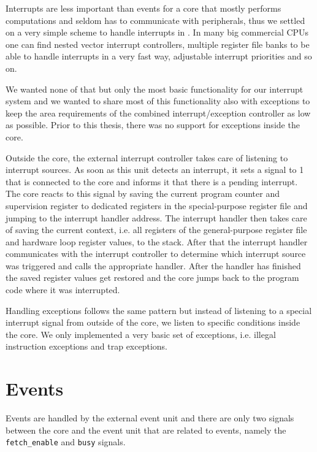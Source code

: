 Interrupts are less important than events for a core that mostly performs
computations and seldom has to communicate with peripherals, thus we settled on
a very simple scheme to handle interrupts in \orion. In many big commercial
\glspl{CPU} one can find nested vector interrupt controllers, multiple register
file banks to be able to handle interrupts in a very fast way, adjustable
interrupt priorities and so on.

We wanted none of that but only the most basic functionality for our interrupt
system and we wanted to share most of this functionality also with exceptions to
keep the area requirements of the combined interrupt/exception controller as low
as possible. Prior to this thesis, there was no support for exceptions inside
the \orion core.

Outside the core, the external interrupt controller takes care of listening to
interrupt sources. As soon as this unit detects an interrupt, it sets a signal
to 1 that is connected to the core and informs it that there is a pending
interrupt. The core reacts to this signal by saving the current program counter
and supervision register to dedicated registers in the special-purpose register
file and jumping to the interrupt handler address. The interrupt handler then
takes care of saving the current context, i.e. all registers of the
general-purpose register file and hardware loop register values, to the stack.
After that the interrupt handler communicates with the interrupt controller to
determine which interrupt source was triggered and calls the appropriate handler.
After the handler has finished the saved register values get restored and the
core jumps back to the program code where it was interrupted.

Handling exceptions follows the same pattern but instead of listening to a
special interrupt signal from outside of the core, we listen to specific
conditions inside the core. We only implemented a very basic set of exceptions,
i.e. illegal instruction exceptions and trap exceptions.


\section{Events}

Events are handled by the external event unit and there are only two signals
between the core and the event unit that are related to events, namely the
\texttt{fetch\_enable} and \texttt{busy} signals.

